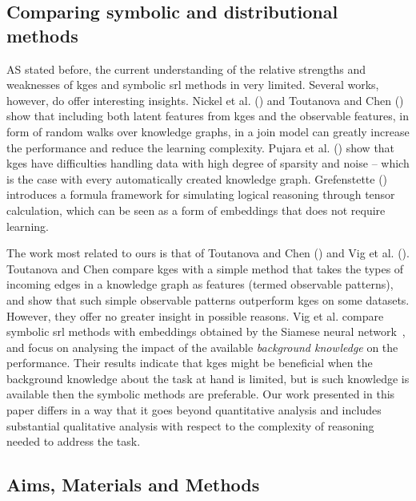 \subsection{Comparing symbolic and distributional methods}


AS stated before, the current understanding of the relative strengths and weaknesses of \gls{kge}s and symbolic \gls{srl} methods in very limited.
Several works, however, do offer interesting insights.
Nickel et al. (\cite{NickleNIPS2014}) and Toutanova and Chen (\cite{toutanova2015observed}) show that including both latent features from \gls{kge}s and the observable features, in form of random walks over knowledge graphs, in a join model can greatly increase the performance and reduce the learning complexity.
Pujara et al. (\cite{pujara:emnlp17}) show that \gls{kge}s have difficulties handling data with high degree of sparsity and noise -- which is the case with every automatically created knowledge graph.
Grefenstette (\cite{GrefenstetteTFDS}) introduces a formula framework for simulating logical reasoning through tensor calculation, which can be seen as a form of embeddings that does not require learning.


The work most related to ours is that of Toutanova and Chen (\cite{toutanova2015observed}) and Vig et al. (\cite{VigILP2017}).
Toutanova and Chen compare \gls{kge}s with a simple method that takes the types of incoming edges in a knowledge graph as features (termed observable patterns), and show that such simple observable patterns outperform \gls{kge}s on some datasets.
However, they offer no greater insight in possible reasons.
Vig et al.  compare symbolic \gls{srl} methods with embeddings obtained by the Siamese neural network~\cite{Bromley:1993:SVU:2987189.2987282}, and focus on analysing the impact of the available \textit{background knowledge} on the performance.
Their results indicate that \gls{kge}s might be beneficial when the background knowledge about the task at hand is limited, but is such knowledge is available then the symbolic methods are preferable.
Our work presented in this paper differs in a way that it goes beyond quantitative analysis and includes substantial qualitative analysis with respect to the complexity of reasoning needed to address the task.



\subsection{Aims, Materials and Methods}

